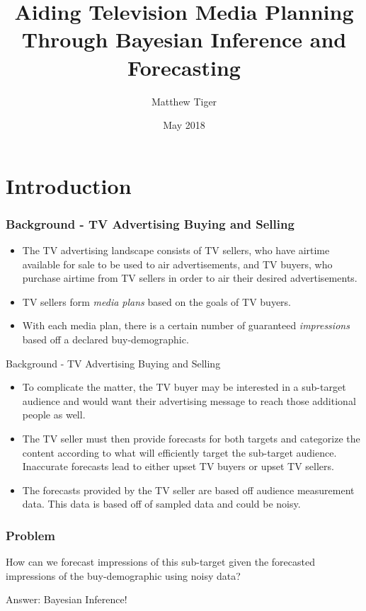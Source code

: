 \documentclass{beamer}
\title{Aiding Television Media Planning Through Bayesian Inference and Forecasting}
\author{Matthew Tiger}
\institute{Towson University}
\date{May 2018}
\begin{document}
\frame{\titlepage}

\frame{\tableofcontents}


\section{Introduction}

\begin{frame}
\frametitle{Background - TV Advertising Buying and Selling}

\begin{itemize}
\item
  The TV advertising landscape consists of TV sellers, who have airtime available
  for sale to be used to air advertisements, and TV buyers, who purchase airtime
  from TV sellers in order to air their desired advertisements.
\pause
\item TV sellers form \emph{media plans} based on the goals of TV buyers.
\pause
\item With each media plan, there is a certain number of guaranteed \emph{impressions} based off a declared buy-demographic.
\pause
\end{itemize}
\end{frame}

\begin{frame}{Background - TV Advertising Buying and Selling}
\begin{itemize}
\item To complicate the matter, the TV buyer may be interested in a sub-target audience and would want their advertising message to reach those additional people as well.
\pause
\item The TV seller must then provide forecasts for both targets and categorize the content according to what will efficiently target the sub-target audience. Inaccurate forecasts lead to either upset TV buyers or upset TV sellers.
\pause
\item The forecasts provided by the TV seller are based off audience measurement data. This data is based off of sampled data and could be noisy.
\end{itemize}
\end{frame}
\begin{frame}
\frametitle{Problem}

How can we forecast impressions of this sub-target given the forecasted impressions of the buy-demographic using noisy data?

\pause

Answer: \alert{Bayesian Inference!}
\end{frame}
\end{document}
